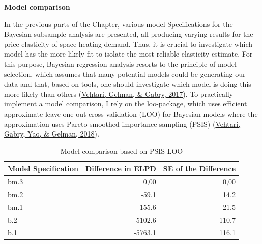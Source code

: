 \documentclass[12pt,twoside]{reedthesis}
\begin{document}
\textbf{Model comparison}

In the previous parts of the Chapter, various model Specifications for the Bayesian subsample analysis are presented, all producing varying results for the price elasticity of space heating demand. Thus, it is crucial to investigate which model has the more likely fit to isolate the most reliable elasticity estimate. For this purpose, Bayesian regression analysis resorts to the principle of model selection, which assumes that many potential models could be generating our data and that, based on tools, one should investigate which model is doing this more likely than others (\protect\hyperlink{ref-vehtari_etal17}{Vehtari, Gelman, \& Gabry, 2017}). To practically implement a model comparison, I rely on the loo-package, which uses efficient approximate leave-one-out cross-validation (LOO) for Bayesian models where the approximation uses Pareto smoothed importance sampling (PSIS) (\protect\hyperlink{ref-vehtari2018loo}{Vehtari, Gabry, Yao, \& Gelman, 2018}).
\begin{table}[]
\centering
\caption{Model comparison based on PSIS-LOO}
\label{tab:model-comparison}
\begin{tabular}{@{}lrr@{}}
\toprule
\textbf{Model Specification} & \multicolumn{1}{l}{\textbf{Difference in ELPD}} & \multicolumn{1}{l}{\textbf{SE of the Difference}} \\ \midrule
bm.3 & 0,00 & 0,00 \\
bm.2 & -59.1 & 14.2 \\
bm.1 & -155.6 & 21.5 \\
b.2 & -5102.6 & 110.7 \\
b.1 & -5763.1 & 116.1 \\ \bottomrule
\end{tabular}
\end{table}
\par
\end{document}

